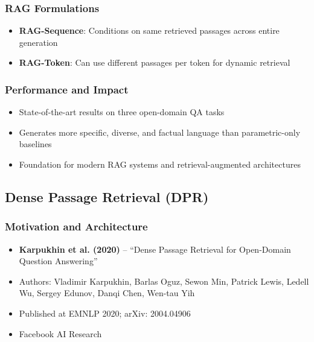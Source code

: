 \documentclass[11pt,letterpaper]{article}
\begin{document}
\subsubsection{RAG Formulations}
\begin{itemize}[leftmargin=*]
    \item \textbf{RAG-Sequence}: Conditions on same retrieved passages across entire generation
    \item \textbf{RAG-Token}: Can use different passages per token for dynamic retrieval
\end{itemize}

\subsubsection{Performance and Impact}
\begin{itemize}[leftmargin=*]
    \item State-of-the-art results on three open-domain QA tasks
    \item Generates more specific, diverse, and factual language than parametric-only baselines
    \item Foundation for modern RAG systems and retrieval-augmented architectures
\end{itemize}

\subsection{Dense Passage Retrieval (DPR)}

\subsubsection{Motivation and Architecture}
\begin{itemize}[leftmargin=*]
    \item \textbf{Karpukhin et al. (2020)} -- ``Dense Passage Retrieval for Open-Domain Question Answering'' \cite{karpukhin2020dpr}
    \item Authors: Vladimir Karpukhin, Barlas Oguz, Sewon Min, Patrick Lewis, Ledell Wu, Sergey Edunov, Danqi Chen, Wen-tau Yih
    \item Published at EMNLP 2020; arXiv: 2004.04906
    \item Facebook AI Research
\end{itemize}
\end{document}
